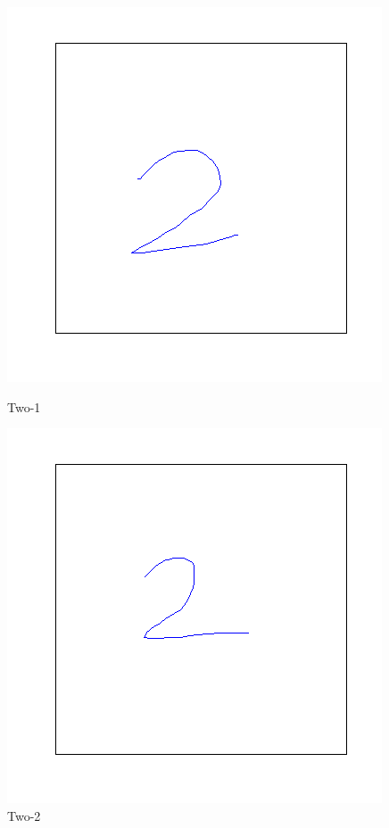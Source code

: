 \documentclass[a4paper, 10pt]{article}
\begin{document}
\begin{figure}[ht]
\begin{minipage}[b]{0.45\linewidth}
\centering
\includegraphics[width=\textwidth]{figs/2-1}
\caption{Two-1}
\label{fig:figure1}
\end{minipage}
\hspace{0.5cm}
\begin{minipage}[b]{0.45\linewidth}
\centering
\includegraphics[width=\textwidth]{figs/2-2}
\caption{Two-2}
\label{fig:figure2}
\end{minipage}
\end{figure}
\end{document}
